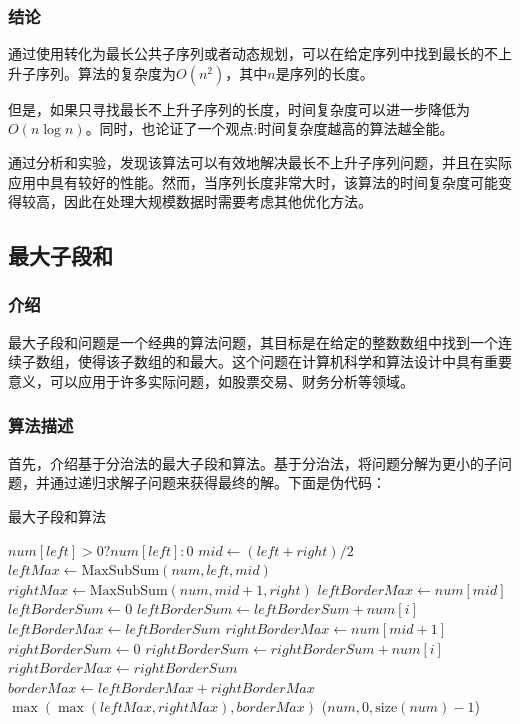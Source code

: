 \documentclass[lang=cn,11pt,a4paper]{elegantpaper}
\begin{document}
\subsubsection{结论}
通过使用转化为最长公共子序列或者动态规划，可以在给定序列中找到最长的不上升子序列。算法的复杂度为$O(n^2)$，其中$n$是序列的长度。

但是，如果只寻找最长不上升子序列的长度，时间复杂度可以进一步降低为$O(n \log n)$。同时，也论证了一个观点:时间复杂度越高的算法越全能。

通过分析和实验，发现该算法可以有效地解决最长不上升子序列问题，并且在实际应用中具有较好的性能。然而，当序列长度非常大时，该算法的时间复杂度可能变得较高，因此在处理大规模数据时需要考虑其他优化方法。

\subsection{最大子段和}

\subsubsection{介绍}
最大子段和问题是一个经典的算法问题，其目标是在给定的整数数组中找到一个连续子数组，使得该子数组的和最大。这个问题在计算机科学和算法设计中具有重要意义，可以应用于许多实际问题，如股票交易、财务分析等领域。
\subsubsection{算法描述}

首先，介绍基于分治法的最大子段和算法。基于分治法，将问题分解为更小的子问题，并通过递归求解子问题来获得最终的解。下面是伪代码：

\begin{algorithm}[H]
\caption{最大子段和算法}
\begin{algorithmic}[1]
    \State \Return $num[left] > 0 ? num[left] : 0$
    \EndIf
    \State $mid \gets (left + right) / 2$
    \State $leftMax \gets \text{MaxSubSum}(num, left, mid)$
    \State $rightMax \gets \text{MaxSubSum}(num, mid + 1, right)$
    \State $leftBorderMax \gets num[mid]$
    \State $leftBorderSum \gets 0$
    \State $leftBorderSum \gets leftBorderSum + num[i]$
    \State $leftBorderMax \gets leftBorderSum$
    \EndIf
    \EndFor
    \State $rightBorderMax \gets num[mid + 1]$
    \State $rightBorderSum \gets 0$
    \State $rightBorderSum \gets rightBorderSum + num[i]$
    \State $rightBorderMax \gets rightBorderSum$
    \EndIf
    \EndFor
    \State $borderMax \gets leftBorderMax + rightBorderMax$
    \State \Return $\max(\max(leftMax, rightMax), borderMax)$
\EndFunction
\State
{} 
    \State \Return {}($num, 0, \text{size}(num) - 1$)
\EndFunction
\end{algorithmic}
\end{algorithm}
\end{document}
